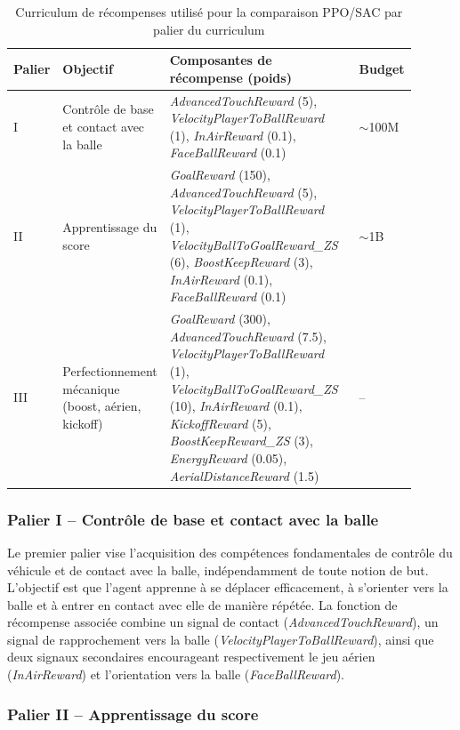 \begin{table}[h]
\centering
\small
\begin{tabular}{|p{0.12\linewidth}|p{0.18\linewidth}|p{0.5\linewidth}|p{0.1\linewidth}|}
\hline
\textbf{Palier} & \textbf{Objectif} & \textbf{Composantes de récompense (poids)} & \textbf{Budget} \\
\hline
I & Contrôle de base et contact avec la balle &
\textit{AdvancedTouchReward} (5), \textit{VelocityPlayerToBallReward} (1), \textit{InAirReward} (0.1), \textit{FaceBallReward} (0.1) &
$\sim$100M \\
\hline
II & Apprentissage du score &
\textit{GoalReward} (150), \textit{AdvancedTouchReward} (5), \textit{VelocityPlayerToBallReward} (1), \textit{VelocityBallToGoalReward\_ZS} (6), \textit{BoostKeepReward} (3), \textit{InAirReward} (0.1), \textit{FaceBallReward} (0.1) &
$\sim$1B \\
\hline
III & Perfectionnement mécanique (boost, aérien, kickoff) &
\textit{GoalReward} (300), \textit{AdvancedTouchReward} (7.5), \textit{VelocityPlayerToBallReward} (1), \textit{VelocityBallToGoalReward\_ZS} (10), \textit{InAirReward} (0.1), \textit{KickoffReward} (5), \textit{BoostKeepReward\_ZS} (3), \textit{EnergyReward} (0.05), \textit{AerialDistanceReward} (1.5) &
-- \\
\hline
\end{tabular}
\caption{Curriculum de récompenses utilisé pour la comparaison PPO/SAC par palier du curriculum}
\label{tab:sac_ppo_phases}
\end{table}

\subsubsection{Palier I -- Contrôle de base et contact avec la balle}
\label{sec:palier1}

Le premier palier vise l'acquisition des compétences fondamentales de contrôle du véhicule et de contact avec la balle, indépendamment de toute notion de but. L'objectif est que l'agent apprenne à se déplacer efficacement, à s'orienter vers la balle et à entrer en contact avec elle de manière répétée. La fonction de récompense associée combine un signal de contact (\textit{AdvancedTouchReward}), un signal de rapprochement vers la balle (\textit{VelocityPlayerToBallReward}), ainsi que deux signaux secondaires encourageant respectivement le jeu aérien (\textit{InAirReward}) et l'orientation vers la balle (\textit{FaceBallReward}).

\subsubsection{Palier II -- Apprentissage du score}


